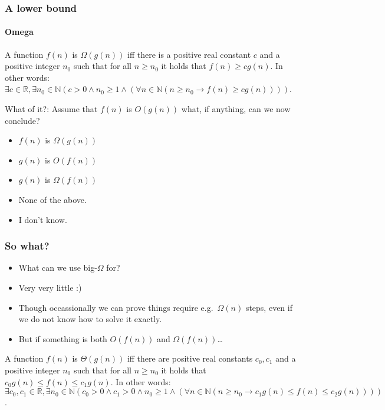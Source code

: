 \begin{frame}
	\frametitle{A lower bound}
	\framesubtitle{Omega}
	\begin{definition}
		A function $f(n)$ is $\Omega(g(n))$ iff there is a positive real constant $c$ and a positive integer $n_0$ such that for
		all $n \geq n_0$ it holds that $f(n) \geq c g(n)$. In other words:\\
		$\exists c \in \mathbb{R}, \exists n_0 \in \mathbb{N} (c > 0 \wedge n_0 \geq 1 \wedge (\forall n \in \mathbb{N} (n
		\geq n_0 \to f(n) \geq cg(n))))$.
	\end{definition}
	
What of it?:	Assume that $f(n)$ is $O(g(n))$ what, if anything, can we now conclude?
		\begin{itemize}
			\item $f(n)$ is $\Omega(g(n))$
			\item $g(n)$ is $O(f(n))$
			\item $g(n)$ is $\Omega(f(n))$
			\item None of the above.
			\item I don't know.
		\end{itemize}
\end{frame}

\begin{frame}
	\frametitle{So what?}
	\begin{itemize}
	\item What can we use big-$\Omega$ for?

	\item Very very little :)
		
	\item Though occassionally we can prove things require e.g.\ $\Omega(n)$ steps, even if we do not know how to solve it
		exactly.
		
	\item But if something is both $O(f(n))$ and $\Omega(f(n))$\dots
	\end{itemize}
	
	\begin{definition}
		A function $f(n)$ is $\Theta(g(n))$ iff there are positive real constants $c_0, c_1$ and a positive integer $n_0$ such that for
		all $n \geq n_0$ it holds that $c_0 g(n) \leq f(n) \leq c_1 g(n)$. In other words:\\
		{\small
		$\exists c_0,c_1 \in \mathbb{R}, \exists n_0 \in \mathbb{N} (c_0> 0 \wedge c_1 > 0\wedge n_0 \geq 1 \wedge (\forall
		n \in \mathbb{N} (n \geq n_0 \to c_1 g(n) \leq f(n) \leq c_2 g(n))))$.
	}
	\end{definition}
\end{frame}

